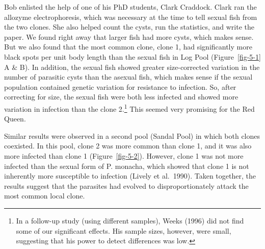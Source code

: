 \documentclass[
  letterpaper,
]{book}
\begin{document}
Bob enlisted the help of one of his PhD students, Clark Craddock. Clark
ran the allozyme electrophoresis, which was necessary at the time to
tell sexual fish from the two clones. She also helped count the cysts,
run the statistics, and write the paper. We found right away that larger
fish had more cysts, which makes sense. But we also found that the most
common clone, clone 1, had significantly more black spots per unit body
length than the sexual fish in Log Pool (Figure~\ref{fig-5-1} A \& B).
In addition, the sexual fish showed greater size-corrected variation in
the number of parasitic cysts than the asexual fish, which makes sense
if the sexual population contained genetic variation for resistance to
infection. So, after correcting for size, the sexual fish were both less
infected and showed more variation in infection than the clone
2.\footnote{In a follow-up study (using different samples), Weeks (1996)
  did not find some of our significant effects. His sample sizes,
  however, were small, suggesting that his power to detect differences
  was low.} This seemed very promising for the Red Queen.

Similar results were observed in a second pool (Sandal Pool) in which
both clones coexisted. In this pool, clone 2 was more common than clone
1, and it was also more infected than clone 1 (Figure~\ref{fig-5-2}).
However, clone 1 was not more infected than the sexual form of P.
monacha, which showed that clone 1 is not inherently more susceptible to
infection (Lively et al.~1990). Taken together, the results suggest that
the parasites had evolved to disproportionately attack the most common
local clone.
\end{document}
